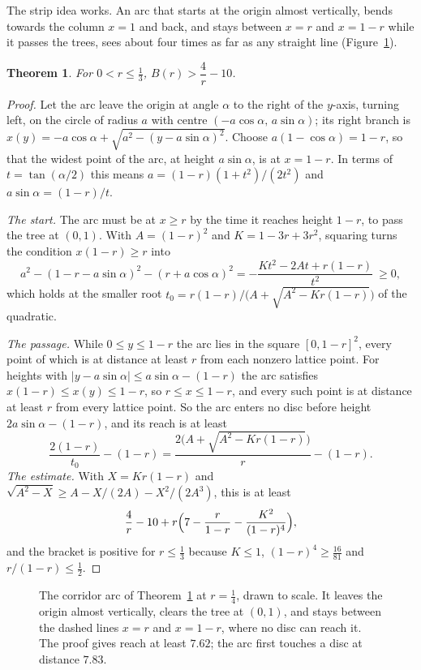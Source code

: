 \documentclass[11pt]{article}
\newtheorem{theorem}{Theorem}
\begin{document}
The strip idea works. An arc that starts at the origin almost vertically, bends towards the column $x=1$ and back,
and stays between $x=r$ and $x=1-r$ while it passes the trees, sees about four times as far as any straight line
(Figure~\ref{fig:corridor}).

\begin{theorem}\label{thm:lower}
For $0<r\le\frac13$, $B(r)>\dfrac4r-10$.
\end{theorem}

\begin{proof}
Let the arc leave the origin at angle $\alpha$ to the right of the $y$-axis, turning left, on the circle of radius $a$
with centre $(-a\cos\alpha,\,a\sin\alpha)$; its right branch is $x(y)=-a\cos\alpha+\sqrt{a^2-(y-a\sin\alpha)^2}$. Choose
$a(1-\cos\alpha)=1-r$, so that the widest point of the arc, at height $a\sin\alpha$, is at $x=1-r$. In terms of
$t=\tan(\alpha/2)$ this means $a=(1-r)(1+t^2)/(2t^2)$ and $a\sin\alpha=(1-r)/t$.

\emph{The start.} The arc must be at $x\ge r$ by the time it reaches height $1-r$, to pass the tree at $(0,1)$.
With $A=(1-r)^2$ and $K=1-3r+3r^2$, squaring turns the condition $x(1-r)\ge r$ into
\[
a^2-(1-r-a\sin\alpha)^2-(r+a\cos\alpha)^2=-\frac{Kt^2-2At+r(1-r)}{t^2}\ \ge0,
\]
which holds at the smaller root $t_0=r(1-r)/\bigl(A+\sqrt{A^2-Kr(1-r)}\bigr)$ of the quadratic.

\emph{The passage.} While $0\le y\le1-r$ the arc lies in the square $[0,1-r]^2$, every point of which is at distance
at least $r$ from each nonzero lattice point. For heights with $|y-a\sin\alpha|\le a\sin\alpha-(1-r)$ the arc satisfies
$x(1-r)\le x(y)\le1-r$, so $r\le x\le1-r$, and every such point is at distance at least $r$ from every lattice point.
So the arc enters no disc before height $2a\sin\alpha-(1-r)$, and its reach is at least
\[
\frac{2(1-r)}{t_0}-(1-r)=\frac{2\bigl(A+\sqrt{A^2-Kr(1-r)}\bigr)}{r}-(1-r).
\]
\emph{The estimate.} With $X=Kr(1-r)$ and $\sqrt{A^2-X}\ge A-X/(2A)-X^2/(2A^3)$, this is at least
\[
\frac4r-10+r\Bigl(7-\frac r{1-r}-\frac{K^2}{(1-r)^4}\Bigr),
\]
and the bracket is positive for $r\le\frac13$ because $K\le1$, $(1-r)^4\ge\frac{16}{81}$ and $r/(1-r)\le\frac12$.
\end{proof}

\begin{figure}[ht]
\centering

\caption{The corridor arc of Theorem~\ref{thm:lower} at $r=\frac14$, drawn to scale. It leaves the origin almost
vertically, clears the tree at $(0,1)$, and stays between the dashed lines $x=r$ and $x=1-r$, where no disc can
reach it. The proof gives reach at least $7.62$; the arc first touches a disc at distance $7.83$.}
\label{fig:corridor}
\end{figure}
\end{document}

